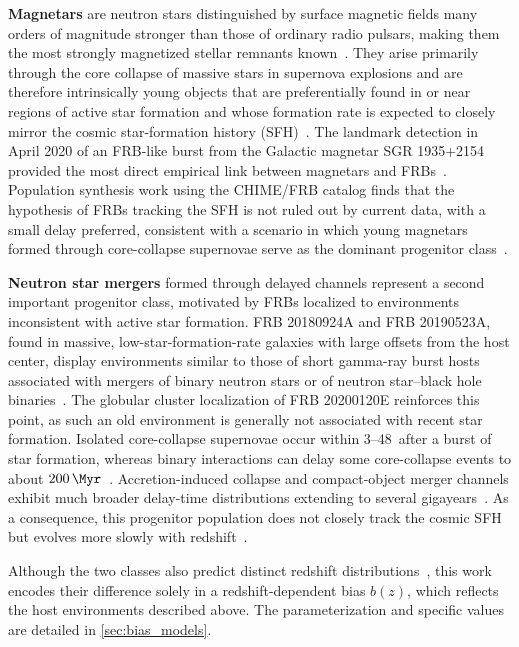 \textbf{Magnetars} are neutron stars distinguished by surface magnetic fields many orders of magnitude stronger than those of 
ordinary radio pulsars, making them the most strongly magnetized stellar remnants known~\cite{Petroff_2019}. 
They arise primarily through the core collapse of massive stars in supernova explosions and are therefore intrinsically young 
objects that are preferentially found in or 
near regions of active star formation and whose formation rate is expected to closely mirror the cosmic star-formation history (SFH)~\cite{Pelliciari_2023}.
The landmark detection in April 2020 of an FRB-like burst from the Galactic magnetar SGR 1935+2154 provided the most direct empirical 
link between magnetars and FRBs~\cite{CHIMEFRB_2020}.
Population synthesis work using the CHIME/FRB catalog finds that the hypothesis of FRBs tracking the SFH is not ruled out by 
current data, with a small delay preferred, consistent with a scenario in which young magnetars formed through core-collapse supernovae 
serve as the dominant progenitor class~\cite{MengDeng_2025}.

\textbf{Neutron star mergers} formed through delayed channels represent a second important progenitor class, motivated by FRBs 
localized to environments inconsistent with active star formation. FRB 20180924A and FRB 20190523A, found in massive, 
low-star-formation-rate galaxies with large offsets from the host center, display environments similar to those of short 
gamma-ray burst hosts associated with mergers of binary neutron stars or of neutron star--black hole binaries~\cite{Wang_2020}.
The globular cluster localization of FRB 20200120E reinforces this point, as such an old environment is generally not associated with recent star formation.
Isolated core-collapse supernovae occur within 3--48\,\unit{\Myr} after a burst of star formation, 
whereas binary interactions can delay some core-collapse events to about $\qty{200}{\Myr}$~\cite{Zapartas_2017}. 
Accretion-induced collapse and compact-object merger channels exhibit much broader delay-time distributions 
extending to several gigayears~\cite{Ruiter_2019}.
As a consequence, this progenitor population does not closely track the cosmic SFH but evolves 
more slowly with redshift~\cite{Lin_2022}.

Although the two classes also predict distinct redshift distributions~\cite{Lin_2022}, this work encodes 
their difference solely in a redshift-dependent bias $b(z)$, which reflects the host environments described 
above. 
The parameterization and specific values are detailed in \autoref{sec:bias_models}.

